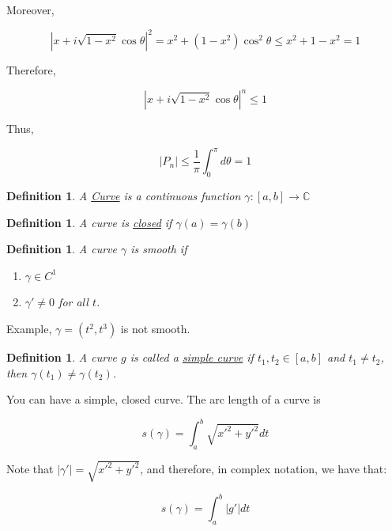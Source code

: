 \documentclass{article}
\newtheorem{definition}[theorem]{Definition}
\newtheorem{one minute paper}[theorem]{One Minute Paper}
\begin{document}
Moreover, 

\begin{equation}
    |x + i\sqrt{1 - x^2}\cos\theta|^2 = x^2 + (1 - x^2)\cos^2\theta \leq x^2 + 1 - x^2 = 1
\end{equation}

Therefore, 

\begin{equation}
    |x + i \sqrt{1 - x^2}\cos\theta|^n \leq 1
\end{equation}

Thus, 

\begin{equation}
    |P_n| \leq \frac{1}{\pi}\int_0^\pi d\theta = 1
\end{equation}

\begin{definition}
    A \underline{Curve} is a continuous function $\gamma:[a,b] \to \mathbb{C}$
\end{definition}

\begin{definition}
     A curve is \underline{closed} if $\gamma(a) = \gamma(b)$
\end{definition}

\begin{definition}
    A curve $\gamma$ is smooth if 
    \begin{enumerate}
        \item $\gamma \in C^1$
        \item $\gamma' \neq 0$ for all $t$.  
    \end{enumerate}
\end{definition}

Example, $\gamma = (t^2, t^3)$ is not smooth. 

\begin{definition}
    A curve $g$ is called a \underline{simple curve} if $t_1,t_2 \in [a,b]$ and $t_1 \neq t_2$, then $\gamma(t_1) \neq \gamma(t_2)$. 
\end{definition}

You can have a simple, closed curve. The arc length of a curve is 

\begin{equation}
    s(\gamma) = \int_a^b \sqrt{x'^2 + y'^2}dt
\end{equation}

Note that $|\gamma'| = \sqrt{x'^2 + y'^2}$, and therefore, in complex notation, we have that:

\begin{equation}
    s(\gamma) = \int_a^b |g'| dt
\end{equation}
\end{document}
